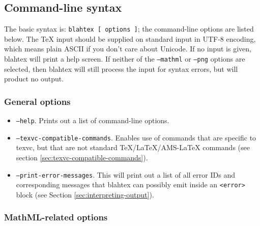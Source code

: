 \documentclass{article}
\begin{document}
\subsection{Command-line syntax}\label{sec:command-line-syntax}

The basic syntax is: \texttt{blahtex [ options ]}; the command-line options are listed below. The \TeX{} input should be supplied on standard input in UTF-8 encoding, which means plain ASCII if you don't care about Unicode. If no input is given, blahtex will print a help screen. If neither of the \texttt{--mathml} or \texttt{--png} options are selected, then blahtex will still process the input for syntax errors, but will product no output.

\subsubsection{General options}

\begin{itemize}
\item \texttt{--help}. Prints out a list of command-line options.
\item \texttt{--texvc-compatible-commands}. Enables use of commands that are specific to texvc, but that are not standard \TeX{}/\LaTeX{}/AMS-\LaTeX{} commands (see section \ref{sec:texvc-compatible-commands}).
\item \texttt{--print-error-messages}. This will print out a list of all error IDs and corresponding messages that blahtex can possibly emit inside an \texttt{<error>} block (see Section \ref{sec:interpreting-output}).
\end{itemize}

\subsubsection{MathML-related options}
\end{document}
